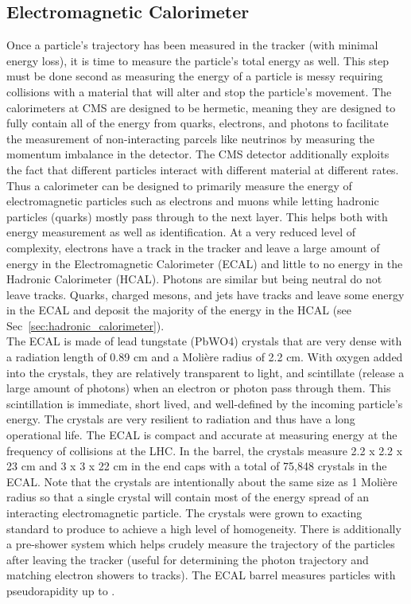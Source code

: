 	\subsection{Electromagnetic Calorimeter}
	\label{sec:electromagnetic_calorimeter}
	Once a particle's trajectory has been measured in the tracker (with minimal energy loss), it is time to measure the particle's total energy as well. This step must be done second as measuring the energy of a particle is messy requiring collisions with a material that will alter and stop the particle's movement. The calorimeters at CMS are designed to be hermetic, meaning they are designed to fully contain all of the energy from quarks, electrons, and photons to facilitate the measurement of non-interacting parcels like neutrinos by measuring the momentum imbalance in the detector. The CMS detector additionally exploits the fact that different particles interact with different material at different rates. Thus a calorimeter can be designed to primarily measure the energy of electromagnetic particles such as electrons and muons while letting hadronic particles (quarks) mostly pass through to the next layer. This helps both with energy measurement as well as identification. At a very reduced level of complexity, electrons have a track in the tracker and leave a large amount of energy in the Electromagnetic Calorimeter (ECAL) and little to no energy in the Hadronic Calorimeter (HCAL). Photons are similar but being neutral do not leave tracks. Quarks, charged mesons, and jets have tracks and leave some energy in the ECAL and deposit the majority of the energy in the HCAL (see Sec~\ref{sec:hadronic_calorimeter}).\\
	
	The ECAL is made of lead tungstate (PbWO4) crystals that are very dense with a radiation length of 0.89 cm and a Moli\`{e}re radius of 2.2 cm. With oxygen added into the crystals, they are relatively transparent to light, and scintillate (release a large amount of photons) when an electron or photon pass through them. This scintillation is immediate, short lived, and well-defined by the incoming particle's energy. The crystals are very resilient to radiation and thus have a long operational life. The ECAL is compact and accurate at measuring energy at the frequency of collisions at the LHC. In the barrel, the crystals measure 2.2 x 2.2 x 23 cm and 3 x 3 x 22 cm in the end caps with a total of 75,848 crystals in the ECAL. Note that the crystals are intentionally about the same size as 1 Moli\`{e}re radius so that a single crystal will contain most of the energy spread of an interacting electromagnetic particle. The crystals were grown to exacting standard to produce to achieve a high level of homogeneity. There is additionally a pre-shower system which helps crudely measure the trajectory of the particles after leaving the tracker (useful for determining the photon trajectory and matching electron showers to tracks). The ECAL barrel measures particles with pseudorapidity up to \abseta {}.\\
	
